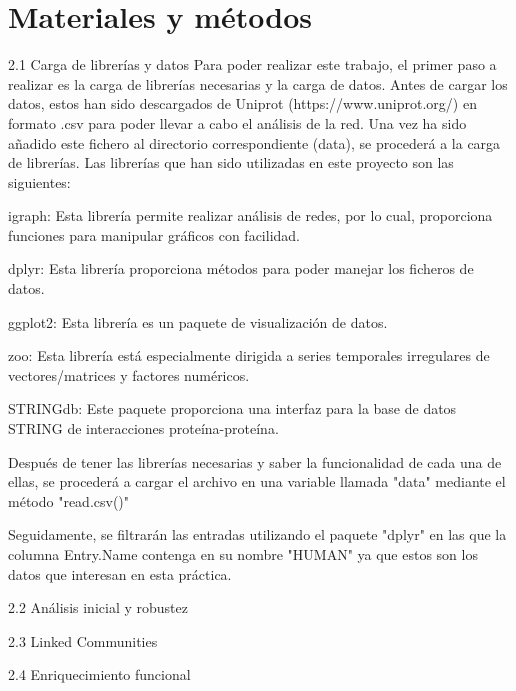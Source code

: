 \section{Materiales y métodos}
2.1 Carga de librerías y datos
Para poder realizar este trabajo, el primer paso a realizar es la carga de librerías necesarias y la carga de datos. Antes de cargar los datos, estos han sido descargados de Uniprot (https://www.uniprot.org/) en formato .csv para poder llevar a cabo el análisis de la red.
Una vez ha sido añadido este fichero al directorio correspondiente (data), se procederá a la carga de librerías.
Las librerías que han sido utilizadas en este proyecto son las siguientes:
\begin{itemsize}
	\item igraph: Esta librería permite realizar análisis de redes, por lo cual, proporciona funciones para manipular gráficos con facilidad.
	\item dplyr: Esta librería proporciona métodos para poder manejar los ficheros de datos.
	\item ggplot2: Esta librería es un paquete de visualización de datos.
	\item zoo: Esta librería está especialmente dirigida a series temporales irregulares de vectores/matrices y factores numéricos. 
	\item STRINGdb: Este paquete proporciona una interfaz para la base de datos STRING de interacciones proteína-proteína.
\end{itemsize}

Después de tener las librerías necesarias y saber la funcionalidad de cada una de ellas, se procederá a cargar el archivo en una variable llamada "data" mediante el método "read.csv()"

Seguidamente, se filtrarán las entradas utilizando el paquete "dplyr" en las que la columna Entry.Name contenga en su nombre "HUMAN" ya que estos son los datos que interesan en esta práctica.



	



2.2 Análisis inicial y robustez

2.3 Linked Communities

2.4 Enriquecimiento funcional

